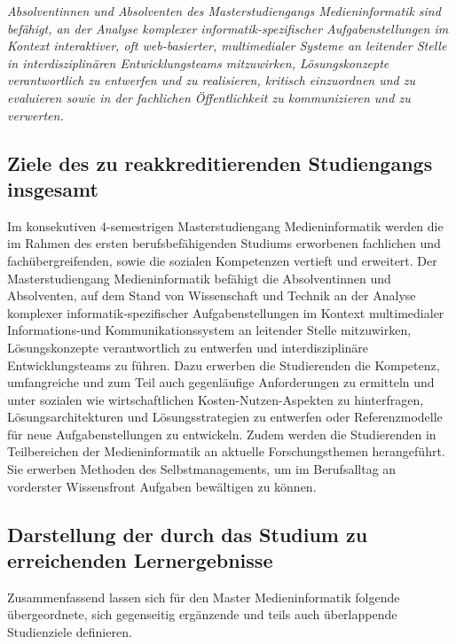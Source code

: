 \emph{Absolventinnen und Absolventen des Masterstudiengangs
Medieninformatik sind befähigt, an der Analyse komplexer
informatik-spezifischer Aufgabenstellungen im Kontext interaktiver, oft
web-basierter, multimedialer Systeme an leitender Stelle in
interdisziplinären Entwicklungsteams mitzuwirken, Lösungskonzepte
verantwortlich zu entwerfen und zu realisieren, kritisch einzuordnen und
zu evaluieren sowie in der fachlichen Öffentlichkeit zu kommunizieren
und zu verwerten.}

\subsection{Ziele des zu reakkreditierenden Studiengangs
insgesamt}\label{ziele-des-zu-reakkreditierenden-studiengangs-insgesamt-1}

Im konsekutiven 4-semestrigen Masterstudiengang Medieninformatik werden
die im Rahmen des ersten berufsbefähigenden Studiums erworbenen
fachlichen und fachübergreifenden, sowie die sozialen Kompetenzen
vertieft und erweitert. Der Masterstudiengang Medieninformatik befähigt
die Absolventinnen und Absolventen, auf dem Stand von Wissenschaft und
Technik an der Analyse komplexer informatik-spezifischer
Aufgabenstellungen im Kontext multimedialer Informations-und
Kommunikationssystem an leitender Stelle mitzuwirken, Lösungskonzepte
verantwortlich zu entwerfen und interdisziplinäre Entwicklungsteams zu
führen. Dazu erwerben die Studierenden die Kompetenz, umfangreiche und
zum Teil auch gegenläufige Anforderungen zu ermitteln und unter sozialen
wie wirtschaftlichen Kosten-Nutzen-Aspekten zu hinterfragen,
Lösungsarchitekturen und Lösungsstrategien zu entwerfen oder
Referenzmodelle für neue Aufgabenstellungen zu entwickeln. Zudem werden
die Studierenden in Teilbereichen der Medieninformatik an aktuelle
Forschungsthemen herangeführt. Sie erwerben Methoden des
Selbstmanagements, um im Berufsalltag an vorderster Wissensfront
Aufgaben bewältigen zu können.

\subsection{Darstellung der durch das Studium zu erreichenden
Lernergebnisse}\label{darstellung-der-durch-das-studium-zu-erreichenden-lernergebnisse-1}

Zusammenfassend lassen sich für den Master Medieninformatik folgende
übergeordnete, sich gegenseitig ergänzende und teils auch überlappende
Studienziele definieren.

